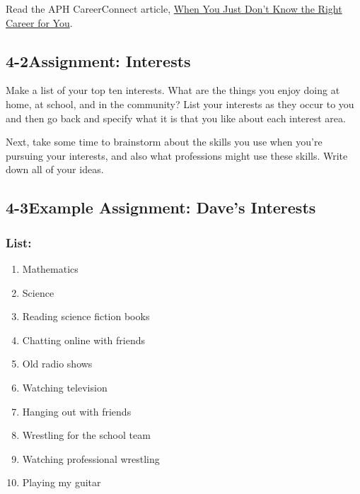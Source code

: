Read the APH CareerConnect article, \href{https://test.aphcareerconnect.org/blog/careerconnect-blog/when-you-just-dont-know-the-right-career-for-you-as-a-person-who-is-blind-or-visually-impaired/}{When You Just Don't Know the Right Career for You}.

\pagebreak \subsection*{4-2\quad Assignment: Interests}
Make a list of your top ten interests. What are the things you enjoy doing at home, at school, and in the community? List your interests as they occur to you and then go back and specify what it is that you like about each interest area.

Next, take some time to brainstorm about the skills you use when you're pursuing your interests, and also what professions might use these skills. Write down all of your ideas.
\pagebreak \subsection*{4-3\quad Example Assignment: Dave's Interests}
\subsubsection*{List:}
\begin{enumerate}[leftmargin=1cm]
	\item Mathematics
	\item Science
	\item Reading science fiction books
	\item Chatting online with friends
	\item Old radio shows
	\item Watching television
	\item Hanging out with friends
	\item Wrestling for the school team
	\item Watching professional wrestling
	\item Playing my guitar
\end{enumerate}
